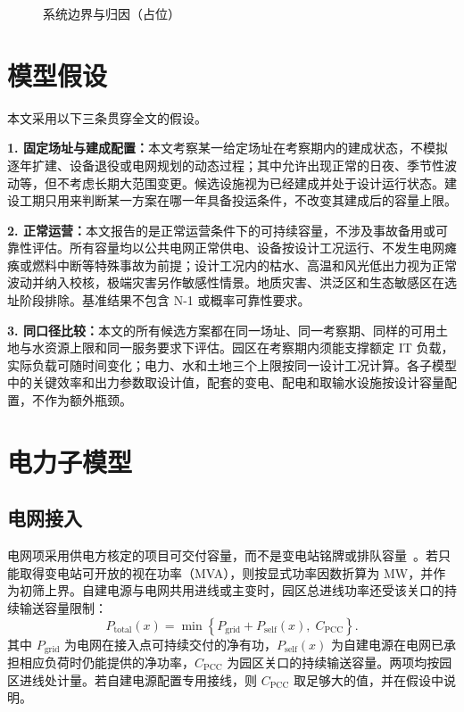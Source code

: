 \documentclass{mcmthesis}
\begin{document}
\begin{figure}[H]
\centering
{}
\caption{系统边界与归因（占位）}
\label{fig:boundary}
\end{figure}

\section{模型假设}
\label{sec:assumptions}

本文采用以下三条贯穿全文的假设。

\noindent\textbf{1. 固定场址与建成配置：}本文考察某一给定场址在考察期内的建成状态，不模拟逐年扩建、设备退役或电网规划的动态过程；其中允许出现正常的日夜、季节性波动等，但不考虑长期大范围变更。候选设施视为已经建成并处于设计运行状态。建设工期只用来判断某一方案在哪一年具备投运条件，不改变其建成后的容量上限。

\noindent\textbf{2. 正常运营：}本文报告的是正常运营条件下的可持续容量，不涉及事故备用或可靠性评估。所有容量均以公共电网正常供电、设备按设计工况运行、不发生电网瘫痪或燃料中断等特殊事故为前提；设计工况内的枯水、高温和风光低出力视为正常波动并纳入校核，极端灾害另作敏感性情景。地质灾害、洪泛区和生态敏感区在选址阶段排除。基准结果不包含 N-1 或概率可靠性要求。

\noindent\textbf{3. 同口径比较：}本文的所有候选方案都在同一场址、同一考察期、同样的可用土地与水资源上限和同一服务要求下评估。园区在考察期内须能支撑额定 IT 负载，实际负载可随时间变化；电力、水和土地三个上限按同一设计工况计算。各子模型中的关键效率和出力参数取设计值，配套的变电、配电和取输水设施按设计容量配置，不作为额外瓶颈。

\section{电力子模型}
\label{sec:power}

\subsection{电网接入}

电网项采用供电方核定的项目可交付容量，而不是变电站铭牌或排队容量~\cite{eirgrid2019}。若只能取得变电站可开放的视在功率（MVA），则按显式功率因数折算为 MW，并作为初筛上界。自建电源与电网共用进线或主变时，园区总进线功率还受该关口的持续输送容量限制：
\begin{equation}
P_{\mathrm{total}}(x)=\min\left\{P_{\mathrm{grid}}+P_{\mathrm{self}}(x),\;C_{\mathrm{PCC}}\right\}.
\tag{2}
\end{equation}
其中 \(P_{\mathrm{grid}}\) 为电网在接入点可持续交付的净有功，\(P_{\mathrm{self}}(x)\) 为自建电源在电网已承担相应负荷时仍能提供的净功率，\(C_{\mathrm{PCC}}\) 为园区关口的持续输送容量。两项均按园区进线处计量。若自建电源配置专用接线，则 \(C_{\mathrm{PCC}}\) 取足够大的值，并在假设中说明。
\end{document}
